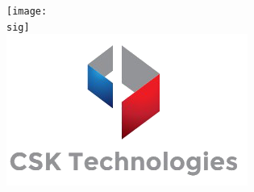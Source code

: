 \documentclass[17pt] {article}
\begin{document}
\clearpage
\recName{}
\giveName{}
\dateAward{}
\titleAward{}
\texttt{[image: \\sig]}
\\
\includegraphics{./img/logo}
\end{document}
